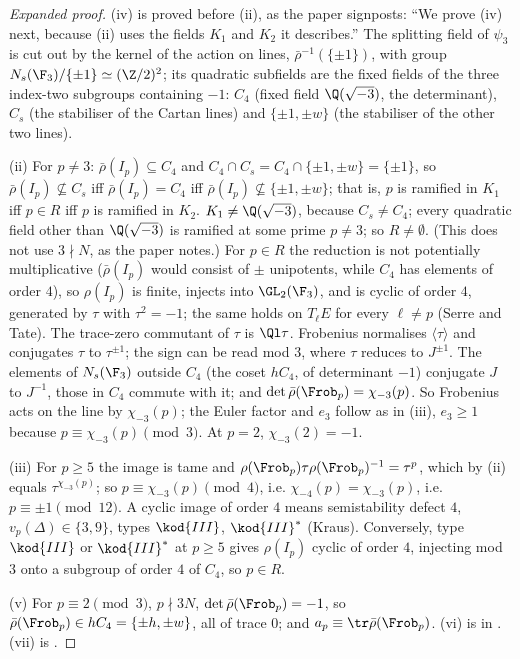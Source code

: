 \begin{sloppypar}
\begin{proof}[Expanded proof]
(iv) is proved before (ii), as the paper signposts: ``We prove (iv) next, because (ii) uses the fields $K_1$ and $K_2$ it describes.'' The splitting field of $\psi_3$ is cut out by the kernel of the action on lines, $\bar\rho^{-1}(\{\pm1\})$, with group $N_s(\F_3)/\{\pm1\}\simeq(\Z/2)^2$;
its quadratic subfields are the fixed fields of the three index-two subgroups containing $-1$: $C_4$ (fixed field $\Q(\sqrt{-3})$, the determinant), $C_s$ (the stabiliser of the
Cartan lines) and $\{\pm1,\pm w\}$ (the stabiliser of the other two lines).

(ii) For $p\ne3$: $\bar\rho(I_p)\subseteq C_4$ and $C_4\cap C_s=C_4\cap\{\pm1,\pm w\}=\{\pm1\}$, so $\bar\rho(I_p)\not\subseteq C_s$ iff $\bar\rho(I_p)=C_4$ iff $\bar\rho(I_p)\not\subseteq\{\pm1,\pm w\}$; that is, $p$ is
ramified in $K_1$ iff $p\in R$ iff $p$ is ramified in $K_2$. $K_1\ne\Q(\sqrt{-3})$, because $C_s\ne C_4$; every quadratic field other than $\Q(\sqrt{-3})$ is ramified at some prime $p\ne3$; so
$R\ne\emptyset$. (This does not use $3\nmid N$, as the paper notes.) For $p\in R$ the reduction is not potentially multiplicative ($\bar\rho(I_p)$ would consist of $\pm$ unipotents, while $C_4$
has elements of order $4$), so $\rho(I_p)$ is finite, injects into $\GL_2(\F_3)$, and is cyclic of order $4$, generated by $\tau$ with $\tau^2=-1$; the same holds on $T_\ell E$ for every
$\ell\ne p$ (Serre and Tate). The trace-zero commutant of $\tau$ is $\Ql\tau$. Frobenius normalises $\langle\tau\rangle$ and conjugates $\tau$ to $\tau^{\pm1}$; the sign can be read mod $3$, where
$\tau$ reduces to $J^{\pm1}$. The elements of $N_s(\F_3)$ outside $C_4$ (the coset $hC_4$, of determinant $-1$) conjugate $J$ to $J^{-1}$, those in $C_4$ commute with it; and
$\det\bar\rho(\Frob_p)=\chi_{-3}(p)$. So Frobenius acts on the line by $\chi_{-3}(p)$; the Euler factor and $e_3$ follow as in (iii), $e_3\ge1$ because
$p\equiv\chi_{-3}(p)\pmod3$. At $p=2$, $\chi_{-3}(2)=-1$.

(iii) For $p\ge5$ the image is tame and $\rho(\Frob_p)\tau\rho(\Frob_p)^{-1}=\tau^p$, which by (ii) equals $\tau^{\chi_{-3}(p)}$; so $p\equiv\chi_{-3}(p)\pmod4$, i.e. $\chi_{-4}(p)=\chi_{-3}(p)$, i.e.
$p\equiv\pm1\pmod{12}$. A cyclic image of order $4$ means semistability defect $4$, $v_p(\Delta)\in\{3,9\}$, types $\kod{III}$, $\kod{III}^*$ (Kraus). Conversely, type $\kod{III}$ or $\kod{III}^*$ at $p\ge5$ gives
$\rho(I_p)$ cyclic of order $4$, injecting mod $3$ onto a subgroup of order $4$ of $C_4$, so $p\in R$.

(v) For $p\equiv2\pmod3$, $p\nmid3N$, $\det\bar\rho(\Frob_p)=-1$, so $\bar\rho(\Frob_p)\in hC_4=\{\pm h,\pm w\}$, all of trace $0$; and $a_p\equiv\tr\bar\rho(\Frob_p)$. (vi) is in .
(vii) is .
\end{proof}


\end{sloppypar}

